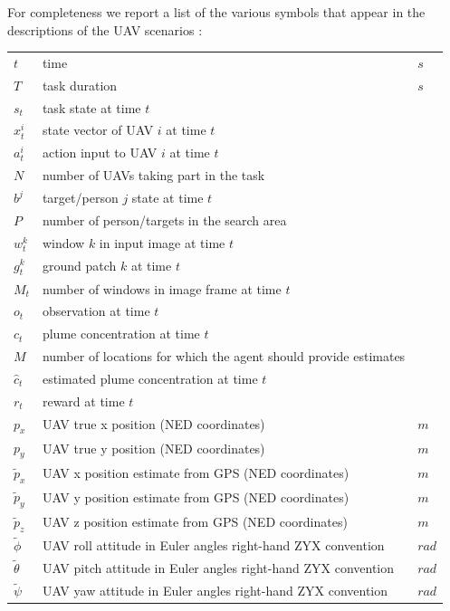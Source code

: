 \documentclass[a4paper,11pt]{report}
\begin{document}
For completeness we report a list of the various symbols that appear in the descriptions of the UAV scenarios :
\begin{table}[ht]  
\begin{tabular}{l l l}
	 $t$ & time & $s$\\
	 $T$ & task duration & $s$\\
	 $s_t$ & task state at time $t$ & \\
	 $x^i_t$ & state vector of UAV $i$ at time $t$ & \\
	 $a^i_t$ & action input to UAV $i$ at time $t$ & \\	
	 $N$ & number of UAVs taking part in the task &\\
	 $b^j$ & target/person $j$ state at time $t$ & \\
	 $P$ & number of person/targets in the search area &\\	 
     $w^k_t$ & window $k$ in input image at time $t$ & \\	
	 $g^k_t$ & ground patch $k$ at time $t$ & \\	
	 $M_t$ & number of windows in image frame at time $t$ \\ 
	 $o_t$ & observation at time $t$ & \\	
	 $c_t$ & plume concentration at time $t$ & \\
	 $M$ & number of locations for which the agent should provide estimates & \\ 
	 $\hat{c}_t$ & estimated plume concentration at time $t$ & \\
	 $r_t$ & reward at time $t$ & \\
     $p_x$ & UAV true x position (NED coordinates)            & $m$\\
     $p_y$ & UAV true y position (NED coordinates)            & $m$\\
     $\tilde{p}_x$ & UAV x position estimate from GPS (NED coordinates)            & $m$\\
     $\tilde{p}_y$ & UAV y position estimate from GPS (NED coordinates)            & $m$\\
     $\tilde{p}_z$ & UAV z position estimate from GPS (NED coordinates)            & $m$\\
     $\tilde{\phi}$ & UAV roll attitude in Euler angles right-hand ZYX convention & $rad$\\
     $\tilde{\theta}$ & UAV pitch attitude in Euler angles right-hand ZYX convention& $rad$\\
     $\tilde{\psi}$ & UAV yaw attitude in Euler angles right-hand ZYX convention  & $rad$\\

\end{tabular}
\end{table}
\end{document}
